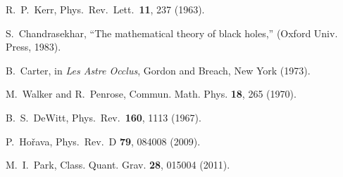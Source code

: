 \documentclass[preprint,aps,tightenlines,showkeys,nofootinbib,superscriptaddress]{revtex4}
\begin{document}
\begin{thebibliography}{999}


  R.~P.~Kerr,
  Phys.\ Rev.\ Lett.\  {\bf 11}, 237 (1963).

S.~Chandrasekhar,
``The mathematical theory of black holes,'' (Oxford Univ.
Press, 1983).


B.~Carter, %
in {\it Les Astre Occlus}, Gordon and Breach, New York (1973).


M.~Walker and R.~Penrose,
Commun. Math. Phys. \textbf{18}, 265
(1970).

  B.~S.~DeWitt,
  Phys.\ Rev.\  {\bf 160}, 1113 (1967).

 P.~Ho\v{r}ava,
  Phys.\ Rev.\  D {\bf 79}, 084008 (2009).

M.~I.~Park,
Class. Quant. Grav. \textbf{28}, 015004 (2011).


\end{thebibliography}
\end{document}
